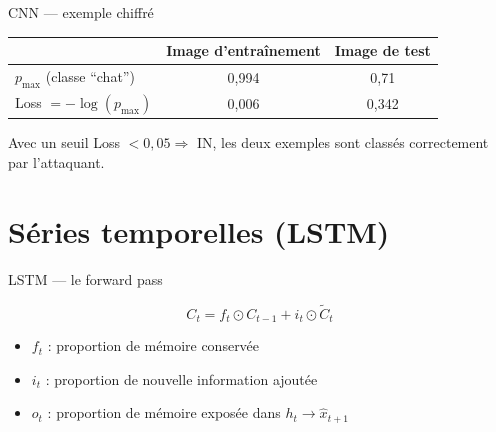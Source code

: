 \documentclass[11pt]{beamer}
\begin{document}
\begin{frame}{CNN --- exemple chiffré}
  \begin{table}
  \centering
  \begin{tabular}{lcc}
    \toprule
     & \textbf{Image d'entraînement} & \textbf{Image de test} \\
    \midrule
    $p_{\max}$ (classe ``chat'') & 0{,}994 & 0{,}71 \\
    Loss $=-\log(p_{\max})$ & 0{,}006 & 0{,}342 \\
    \bottomrule
  \end{tabular}
  \end{table}
  \vspace{3mm}
  Avec un seuil Loss $< 0{,}05 \Rightarrow$ IN, les deux exemples
  sont classés correctement par l'attaquant.
\end{frame}

\section{Séries temporelles (LSTM)}

\begin{frame}{LSTM --- le forward pass}
  \begin{center}
  \end{center}
  \vspace{3mm}
  \[
    C_t = f_t \odot C_{t-1} + i_t \odot \tilde{C}_t
  \]
  \begin{itemize}
    \item $f_t$ : proportion de mémoire conservée
    \item $i_t$ : proportion de nouvelle information ajoutée
    \item $o_t$ : proportion de mémoire exposée dans $h_t \to \hat{x}_{t+1}$
  \end{itemize}
\end{frame}
\end{document}
